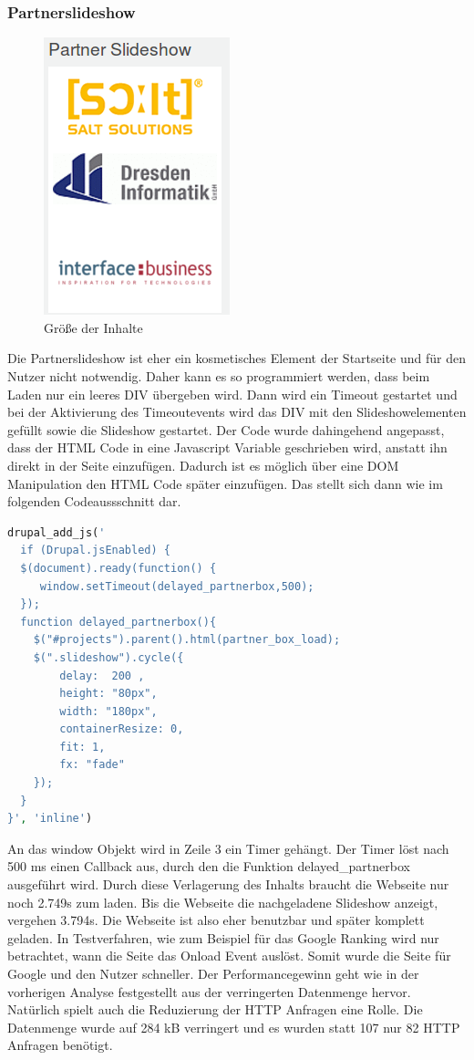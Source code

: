 \subsubsection{Partnerslideshow}
\begin{figure}[!ht]
  \centering
  \includegraphics[scale=0.5]{material/partner_slideshow.png}
  \caption{Größe der Inhalte}
  \label{fig:startbyte}
\end{figure} Die Partnerslideshow ist eher ein kosmetisches Element der Startseite und für den Nutzer nicht notwendig. Daher kann es so programmiert werden, dass beim Laden nur ein leeres DIV übergeben wird. Dann wird ein Timeout gestartet und bei der Aktivierung des Timeoutevents wird das DIV mit den Slideshowelementen gefüllt sowie die Slideshow gestartet. Der Code wurde dahingehend angepasst, dass der HTML Code in eine Javascript Variable geschrieben wird, anstatt ihn direkt in der Seite einzufügen. Dadurch ist es möglich über eine DOM Manipulation den HTML Code später einzufügen. Das stellt sich dann wie im folgenden Codeaussschnitt dar.
\begin{lstlisting}[language=php,label=Javascript - Slideshow,caption=Javascript - Slideshow]
drupal_add_js('
  if (Drupal.jsEnabled) {
  $(document).ready(function() {
     window.setTimeout(delayed_partnerbox,500);
  });
  function delayed_partnerbox(){
	$("#projects").parent().html(partner_box_load);
	$(".slideshow").cycle({
	    delay:  200 ,
	    height: "80px",
	    width: "180px",
	    containerResize: 0,
	    fit: 1,
	    fx: "fade"
	});
  }
}', 'inline')
\end{lstlisting}
An das window Objekt wird in Zeile 3 ein Timer gehängt. Der Timer löst nach 500 ms einen Callback aus, durch den die Funktion delayed\_partnerbox ausgeführt wird. Durch diese Verlagerung des Inhalts braucht die Webseite nur noch 2.749s zum laden. Bis die Webseite die nachgeladene Slideshow anzeigt, vergehen 3.794s. Die Webseite ist also eher benutzbar und später komplett geladen. In Testverfahren, wie zum Beispiel für das Google Ranking wird nur betrachtet, wann die Seite das Onload Event auslöst. Somit wurde die Seite für Google und den Nutzer schneller. Der Performancegewinn geht wie in der vorherigen Analyse festgestellt aus der verringerten Datenmenge hervor. Natürlich spielt auch die Reduzierung der HTTP Anfragen eine Rolle. Die Datenmenge wurde auf 284 kB verringert und es wurden statt 107 nur 82 HTTP Anfragen benötigt.
